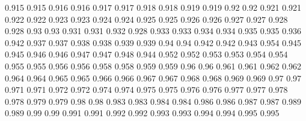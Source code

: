 0.915 0.915
0.916 0.916
0.917 0.917
0.918 0.918
0.919 0.919
0.92 0.92
0.921 0.921
0.922 0.922
0.923 0.923
0.924 0.924
0.925 0.925
0.926 0.926
0.927 0.927
0.928 0.928
0.93 0.93
0.931 0.931
0.932 0.928
0.933 0.933
0.934 0.934
0.935 0.935
0.936 0.942
0.937 0.937
0.938 0.938
0.939 0.939
0.94 0.94
0.942 0.942
0.943 0.954
0.945 0.945
0.946 0.946
0.947 0.947
0.948 0.944
0.952 0.952
0.953 0.953
0.954 0.954
0.955 0.955
0.956 0.956
0.958 0.958
0.959 0.959
0.96 0.96
0.961 0.961
0.962 0.962
0.964 0.964
0.965 0.965
0.966 0.966
0.967 0.967
0.968 0.968
0.969 0.969
0.97 0.97
0.971 0.971
0.972 0.972
0.974 0.974
0.975 0.975
0.976 0.976
0.977 0.977
0.978 0.978
0.979 0.979
0.98 0.98
0.983 0.983
0.984 0.984
0.986 0.986
0.987 0.987
0.989 0.989
0.99 0.99
0.991 0.991
0.992 0.992
0.993 0.993
0.994 0.994
0.995 0.995
